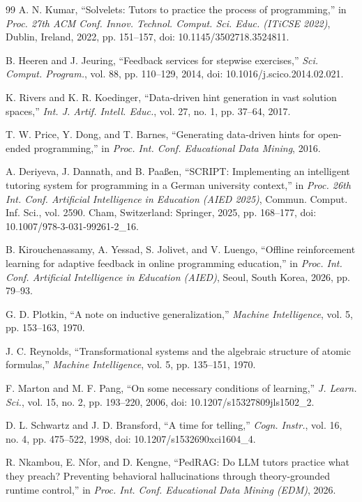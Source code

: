 \documentclass[journal]{IEEEtran}
\begin{document}
\begin{thebibliography}{99}
A. N. Kumar, ``Solvelets: Tutors to practice the process of
programming,'' in \emph{Proc. 27th ACM Conf. Innov. Technol. Comput.
Sci. Educ. (ITiCSE 2022)}, Dublin, Ireland, 2022, pp. 151--157,
doi: 10.1145/3502718.3524811.

B. Heeren and J. Jeuring, ``Feedback services for stepwise
exercises,'' \emph{Sci. Comput. Program.}, vol. 88, pp. 110--129, 2014, doi: 10.1016/j.scico.2014.02.021.

K. Rivers and K. R. Koedinger, ``Data-driven hint generation in
vast solution spaces,'' \emph{Int. J. Artif. Intell. Educ.}, vol. 27, no. 1, pp. 37--64, 2017.

T. W. Price, Y. Dong, and T. Barnes, ``Generating data-driven
hints for open-ended programming,'' in \emph{Proc. Int. Conf.
Educational Data Mining}, 2016.

A. Deriyeva, J. Dannath, and B. Paa{\ss}en, ``SCRIPT: Implementing
an intelligent tutoring system for programming in a German university
context,'' in \emph{Proc. 26th Int. Conf. Artificial Intelligence in
Education (AIED 2025)}, Commun. Comput. Inf. Sci., vol. 2590. Cham,
Switzerland: Springer, 2025, pp. 168--177, doi: 10.1007/978-3-031-99261-2\_16.

B. Kirouchenassamy, A. Yessad, S. Jolivet, and V. Luengo, ``Offline
reinforcement learning for adaptive feedback in online programming
education,'' in \emph{Proc. Int. Conf. Artificial Intelligence in
Education (AIED)}, Seoul, South Korea, 2026, pp. 79--93.

G. D. Plotkin, ``A note on inductive generalization,''
\emph{Machine Intelligence}, vol. 5, pp. 153--163, 1970.

J. C. Reynolds, ``Transformational systems and the algebraic
structure of atomic formulas,'' \emph{Machine Intelligence}, vol. 5,
pp. 135--151, 1970.

F. Marton and M. F. Pang, ``On some necessary conditions of
learning,'' \emph{J. Learn. Sci.}, vol. 15, no. 2, pp. 193--220,
2006, doi: 10.1207/s15327809jls1502\_2.

D. L. Schwartz and J. D. Bransford, ``A time for telling,''
\emph{Cogn. Instr.}, vol. 16, no. 4, pp. 475--522,
1998, doi: 10.1207/s1532690xci1604\_4.

R. Nkambou, E. Nfor, and D. Kengne, ``PedRAG: Do LLM tutors
practice what they preach? Preventing behavioral hallucinations through
theory-grounded runtime control,'' in \emph{Proc. Int. Conf. Educational
Data Mining (EDM)}, 2026.


\end{thebibliography}
\end{document}

